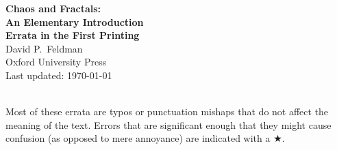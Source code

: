 \documentclass[12pt]{article}
\begin{document}
\pagestyle{empty}

\begin{center}

{\Large {\bf Chaos and Fractals:}}\\
\medskip
{\bf {\large An Elementary Introduction}}\\
\bigskip
{\bf {\LARGE Errata in the First Printing}}\\
\bigskip
{ {\large David P.~Feldman}}\\
\medskip
Oxford University Press\\
\smallskip
Last updated: \today
\end{center}
\hspace{2mm}\\

\noindent Most of these errata are typos or punctuation mishaps that
do not affect the meaning of the text.  Errors that are significant
enough that they might cause confusion (as opposed to mere annoyance)
are indicated with a $\bigstar$.\\ 

\end{document}
